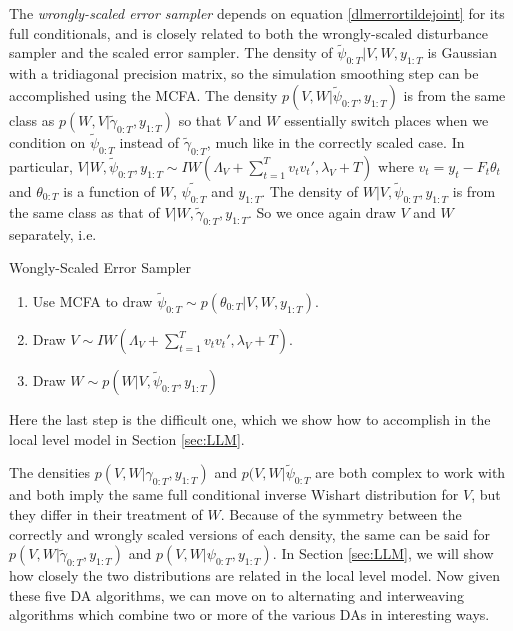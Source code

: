 \documentclass{article}
\begin{document}
The {\it wrongly-scaled error sampler} depends on equation \eqref{dlmerrortildejoint} for its full conditionals, and is closely related to both the wrongly-scaled disturbance sampler and the scaled error sampler. The density of $\tilde{\psi}_{0:T}|V,W,y_{1:T}$ is Gaussian with a tridiagonal precision matrix, so the simulation smoothing step can be accomplished using the MCFA. The density $p(V,W|\tilde{\psi}_{0:T},y_{1:T})$ is from the same class as $p(W,V|\tilde{\gamma}_{0:T},y_{1:T})$ so that $V$ and $W$ essentially switch places when we condition on $\tilde{\psi}_{0:T}$ instead of $\tilde{\gamma}_{0:T}$, much like in the correctly scaled case. In particular, $V|W,\tilde{\psi}_{0:T},y_{1:T} \sim IW\left(\Lambda_V + \sum_{t=1}^Tv_tv_t',\lambda_V + T\right)$ where $v_t = y_t - F_t\theta_t$ and $\theta_{0:T}$ is a function of $W$, $\tilde{\psi_{0:T}}$ and $y_{1:T}$. The density of $W|V,\tilde{\psi}_{0:T},y_{1:T}$ is from the same class as that of $V|W,\tilde{\gamma}_{0:T},y_{1:T}$. So we once again draw $V$ and $W$ separately, i.e. 
\begin{alg*}[W-Error]Wongly-Scaled Error Sampler\label{alg:DLMwerror}
\begin{enumerate}
\item Use MCFA to draw $\tilde{\psi}_{0:T} \sim p(\theta_{0:T}|V,W,y_{1:T})$.
\item Draw $V \sim IW\left(\Lambda_V + \sum_{t=1}^Tv_tv_t',\lambda_V + T\right)$.
\item Draw $W \sim p(W|V,\tilde{\psi}_{0:T},y_{1:T})$
\end{enumerate}
\end{alg*}
Here the last step is the difficult one, which we show how to accomplish in the local level model in Section \ref{sec:LLM}.

The densities $p(V,W|\gamma_{0:T},y_{1:T})$ and $p(V,W|\tilde{\psi}_{0:T}$ are both complex to work with and both imply the same full conditional inverse Wishart distribution for $V$, but they differ in their treatment of $W$. Because of the symmetry between the correctly and wrongly scaled versions of each density, the same can be said for $p(V,W|\tilde{\gamma}_{0:T},y_{1:T})$ and $p(V,W|\psi_{0:T},y_{1:T})$. In Section \ref{sec:LLM}, we will show how closely the two distributions are related in the local level model. Now given these five DA algorithms, we can move on to alternating and interweaving algorithms which combine two or more of the various DAs in interesting ways.
\end{document}
